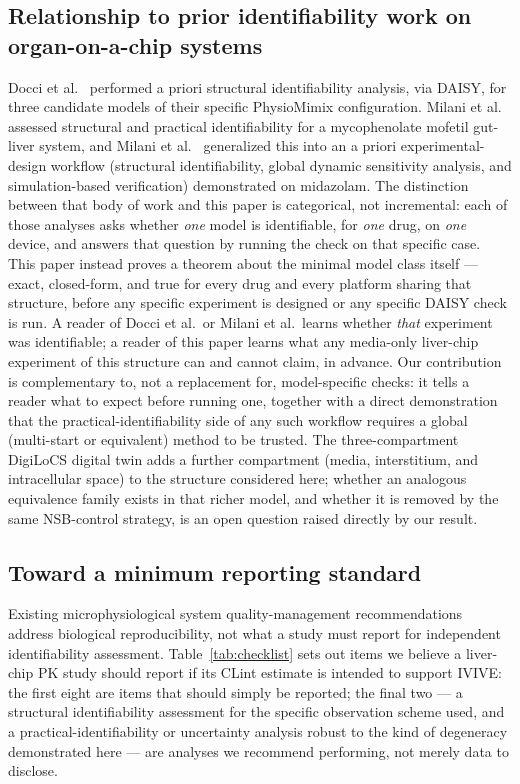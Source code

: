 \subsection*{Relationship to prior identifiability work on organ-on-a-chip systems}

Docci et al.\ \citep{docci2022} performed a priori structural identifiability analysis, via DAISY, for three candidate models of their specific PhysioMimix configuration. Milani et al.\ \citep{milani2022} assessed structural and practical identifiability for a mycophenolate mofetil gut-liver system, and Milani et al.\ \citep{milani2024} generalized this into an a priori experimental-design workflow (structural identifiability, global dynamic sensitivity analysis, and simulation-based verification) demonstrated on midazolam. The distinction between that body of work and this paper is categorical, not incremental: each of those analyses asks whether \emph{one} model is identifiable, for \emph{one} drug, on \emph{one} device, and answers that question by running the check on that specific case. This paper instead proves a theorem about the minimal model class itself --- exact, closed-form, and true for every drug and every platform sharing that structure, before any specific experiment is designed or any specific DAISY check is run. A reader of Docci et al.\ or Milani et al.\ learns whether \emph{that} experiment was identifiable; a reader of this paper learns what any media-only liver-chip experiment of this structure can and cannot claim, in advance. Our contribution is complementary to, not a replacement for, model-specific checks: it tells a reader what to expect before running one, together with a direct demonstration that the practical-identifiability side of any such workflow requires a global (multi-start or equivalent) method to be trusted. The three-compartment DigiLoCS digital twin \citep{aravindakshan2025} adds a further compartment (media, interstitium, and intracellular space) to the structure considered here; whether an analogous equivalence family exists in that richer model, and whether it is removed by the same NSB-control strategy, is an open question raised directly by our result.

\subsection*{Toward a minimum reporting standard}

Existing microphysiological system quality-management recommendations \citep{pamies2024} address biological reproducibility, not what a study must report for independent identifiability assessment. Table~\ref{tab:checklist} sets out items we believe a liver-chip PK study should report if its CLint estimate is intended to support IVIVE: the first eight are items that should simply be reported; the final two --- a structural identifiability assessment for the specific observation scheme used, and a practical-identifiability or uncertainty analysis robust to the kind of degeneracy demonstrated here --- are analyses we recommend performing, not merely data to disclose.

